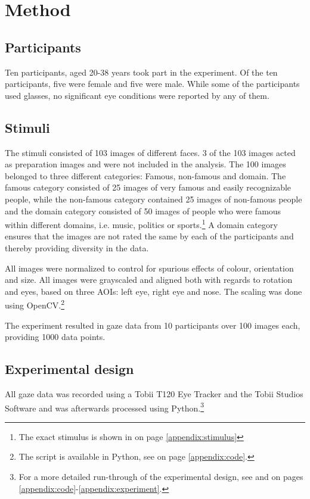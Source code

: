 \documentclass{llncs}
\begin{document}
\section{Method}
\subsection{Participants}
Ten participants, aged 20-38 years took part in the experiment. Of the ten participants, five were female and five were male. While some of the participants used glasses, no significant eye conditions were reported by any of them.

\subsection{Stimuli}
The stimuli consisted of 103 images of different faces. 3 of the 103 images acted as preparation images and were not included in the analysis. The 100 images belonged to three different categories: Famous, non-famous and domain. The famous category consisted of 25 images of very famous and easily recognizable people, while the non-famous category contained 25 images of non-famous people and the domain category consisted of 50 images of people who were famous within different domains, i.e. music, politics or sports.\footnote{The exact stimulus is shown in  on page \ref{appendix:stimulus}} A domain category ensures that the images are not rated the same by each of the participants and thereby providing diversity in the data. 

All images were normalized to control for spurious effects of colour, orientation and size. All images were grayscaled and aligned both with regards to rotation and eyes, based on three AOIs: left eye, right eye and nose. The scaling was done using OpenCV.\footnote{The script is available in Python, see  on page \ref{appendix:code}.}

The experiment resulted in gaze data from 10 participants over 100 images each, providing 1000 data points.

\subsection{Experimental design}
All gaze data was recorded using a Tobii T120 Eye Tracker and the Tobii Studios Software and was
afterwards processed using Python.\footnote{For a more detailed run-through of the experimental design, see  and  on pages \ref{appendix:code}-\ref{appendix:experiment}.}\\
\end{document}

